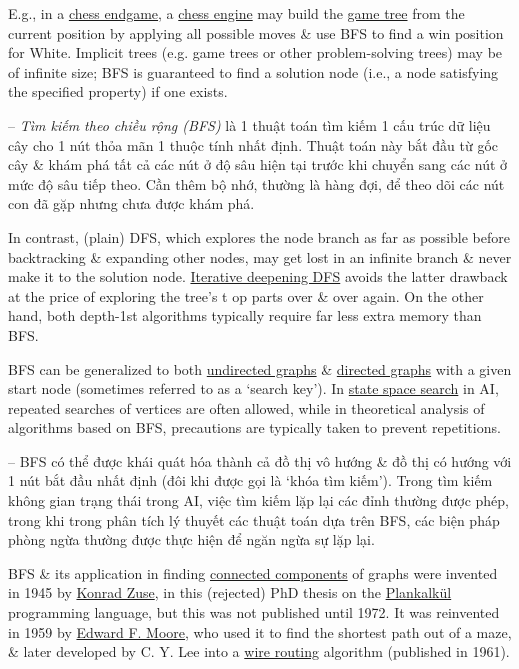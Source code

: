 \documentclass[oneside]{book}
\begin{document}
E.g., in a \href{https://en.wikipedia.org/wiki/Chess_endgame}{chess endgame}, a \href{https://en.wikipedia.org/wiki/Chess_engine}{chess engine} may build the \href{https://en.wikipedia.org/wiki/Game_tree}{game tree} from the current position by applying all possible moves \& use BFS to find a win position for White. Implicit trees (e.g. game trees or other problem-solving trees) may be of infinite size; BFS is guaranteed to find a solution node (i.e., a node satisfying the specified property) if one exists.

-- {\it Tìm kiếm theo chiều rộng (BFS)} là 1 thuật toán tìm kiếm 1 cấu trúc dữ liệu cây cho 1 nút thỏa mãn 1 thuộc tính nhất định. Thuật toán này bắt đầu từ gốc cây \& khám phá tất cả các nút ở độ sâu hiện tại trước khi chuyển sang các nút ở mức độ sâu tiếp theo. Cần thêm bộ nhớ, thường là hàng đợi, để theo dõi các nút con đã gặp nhưng chưa được khám phá.

In contrast, (plain) DFS, which explores the node branch as far as possible before backtracking \& expanding other nodes, may get lost in an infinite branch \& never make it to the solution node. \href{https://en.wikipedia.org/wiki/Iterative_deepening_depth-first_search}{Iterative deepening DFS} avoids the latter drawback at the price of exploring the tree's t op parts over \& over again. On the other hand, both depth-1st algorithms typically require far less extra memory than BFS.

BFS can be generalized to both \href{https://en.wikipedia.org/wiki/Undirected_graph}{undirected graphs} \& \href{https://en.wikipedia.org/wiki/Directed_graph}{directed graphs} with a given start node (sometimes referred to as a `search key'). In \href{https://en.wikipedia.org/wiki/State_space_search}{state space search} in AI, repeated searches of vertices are often allowed, while in theoretical analysis of algorithms based on BFS, precautions are typically taken to prevent repetitions.

-- BFS có thể được khái quát hóa thành cả đồ thị vô hướng \& đồ thị có hướng với 1 nút bắt đầu nhất định (đôi khi được gọi là `khóa tìm kiếm'). Trong tìm kiếm không gian trạng thái trong AI, việc tìm kiếm lặp lại các đỉnh thường được phép, trong khi trong phân tích lý thuyết các thuật toán dựa trên BFS, các biện pháp phòng ngừa thường được thực hiện để ngăn ngừa sự lặp lại.

BFS \& its application in finding \href{https://en.wikipedia.org/wiki/Connected_component_(graph_theory)}{connected components} of graphs were invented in 1945 by \href{https://en.wikipedia.org/wiki/Konrad_Zuse}{\sc Konrad Zuse}, in this (rejected) PhD thesis on the \href{https://en.wikipedia.org/wiki/Plankalk%C3%BCl}{Plankalk\"ul} programming language, but this was not published until 1972. It was reinvented in 1959 by \href{https://en.wikipedia.org/wiki/Edward_F._Moore}{\sc Edward F. Moore}, who used it to find the shortest path out of a maze, \& later developed by {\sc C. Y. Lee} into a \href{https://en.wikipedia.org/wiki/Routing_(electronic_design_automation)}{wire routing} algorithm (published in 1961).
\end{document}
